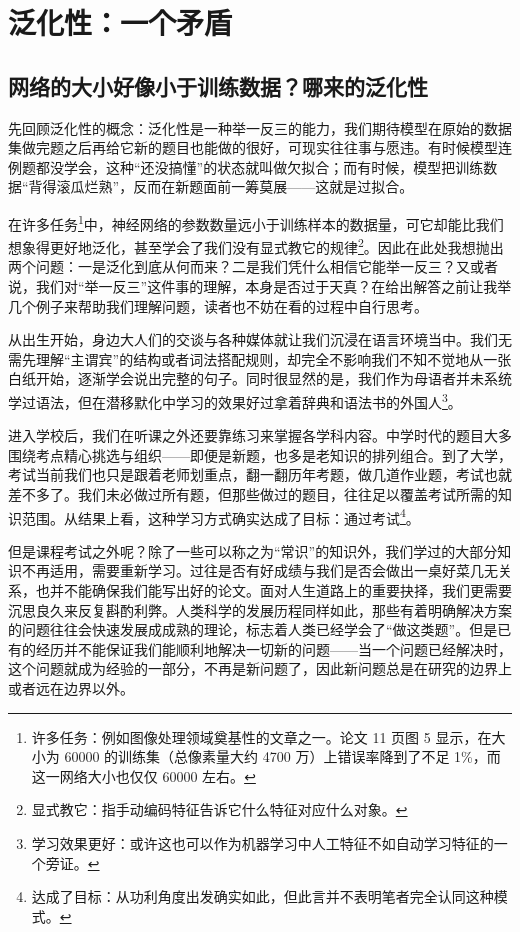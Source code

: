 \section{泛化性：一个矛盾}

\subsection{网络的大小好像小于训练数据？哪来的泛化性}

先回顾泛化性的概念：泛化性是一种举一反三的能力，我们期待模型在原始的数据集做完题之后再给它新的题目也能做的很好，可现实往往事与愿违。有时候模型连例题都没学会，这种“还没搞懂”的状态就叫做欠拟合；而有时候，模型把训练数据“背得滚瓜烂熟”，反而在新题面前一筹莫展——这就是过拟合。

在许多任务\footnote{许多任务：例如图像处理领域奠基性的文章之一。论文 11 页图 5 显示，在大小为 60000 的训练集（总像素量大约 4700 万）上错误率降到了不足 1\%，而这一网络大小也仅仅 60000 左右。}中，神经网络的参数数量远小于训练样本的数据量，可它却能比我们想象得更好地泛化，甚至学会了我们没有显式教它的规律\footnote{显式教它：指手动编码特征告诉它什么特征对应什么对象。}。因此在此处我想抛出两个问题：一是泛化到底从何而来？二是我们凭什么相信它能举一反三？又或者说，我们对“举一反三”这件事的理解，本身是否过于天真？在给出解答之前让我举几个例子来帮助我们理解问题，读者也不妨在看的过程中自行思考。

从出生开始，身边大人们的交谈与各种媒体就让我们沉浸在语言环境当中。我们无需先理解“主谓宾”的结构或者词法搭配规则，却完全不影响我们不知不觉地从一张白纸开始，逐渐学会说出完整的句子。同时很显然的是，我们作为母语者并未系统学过语法，但在潜移默化中学习的效果好过拿着辞典和语法书的外国人\footnote{学习效果更好：或许这也可以作为机器学习中人工特征不如自动学习特征的一个旁证。}。

进入学校后，我们在听课之外还要靠练习来掌握各学科内容。中学时代的题目大多围绕考点精心挑选与组织——即便是新题，也多是老知识的排列组合。到了大学，考试当前我们也只是跟着老师划重点，翻一翻历年考题，做几道作业题，考试也就差不多了。我们未必做过所有题，但那些做过的题目，往往足以覆盖考试所需的知识范围。从结果上看，这种学习方式确实达成了目标：通过考试\footnote{达成了目标：从功利角度出发确实如此，但此言并不表明笔者完全认同这种模式。}。

但是课程考试之外呢？除了一些可以称之为“常识”的知识外，我们学过的大部分知识不再适用，需要重新学习。过往是否有好成绩与我们是否会做出一桌好菜几无关系，也并不能确保我们能写出好的论文。面对人生道路上的重要抉择，我们更需要沉思良久来反复斟酌利弊。人类科学的发展历程同样如此，那些有着明确解决方案的问题往往会快速发展成成熟的理论，标志着人类已经学会了“做这类题”。但是已有的经历并不能保证我们能顺利地解决一切新的问题——当一个问题已经解决时，这个问题就成为经验的一部分，不再是新问题了，因此新问题总是在研究的边界上或者远在边界以外。


